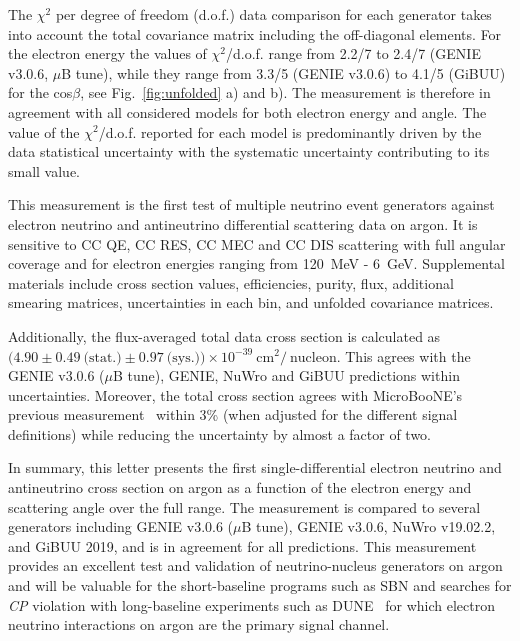 \documentclass[%
twocolumn,
superscriptaddress,
showpacs,preprintnumbers,
amsmath,amssymb,
aps,
prl,
longbibliography
]{revtex4-1}
\begin{document}
 The $\chi^2$ per degree of freedom (d.o.f.) data comparison for each generator takes into account the total covariance matrix including the off-diagonal elements. For the electron energy the values of $\chi^2$/d.o.f. range from 2.2/7 to 2.4/7 (GENIE v3.0.6, $\mu$B tune), while they range from 3.3/5 (GENIE v3.0.6) to 4.1/5 (GiBUU) for the cos$\beta$, see Fig.~\ref{fig:unfolded} a) and b). The measurement is therefore in agreement with all considered models for both electron energy and angle. The value of the $\chi^2$/d.o.f. reported for each model is predominantly driven by the data statistical uncertainty with the systematic uncertainty contributing to its small value.
 
 
This measurement is the first test of multiple neutrino event generators against electron neutrino and antineutrino differential scattering data on argon. It is sensitive to CC QE, CC RES, CC MEC and CC DIS scattering with full angular coverage and for electron energies ranging from 120~MeV - 6~GeV. Supplemental materials include cross section values, efficiencies, purity, flux, additional smearing matrices, uncertainties in each bin, and unfolded covariance matrices. 

Additionally, the flux-averaged total data cross section is calculated as $(4.90\pm\!0.49~\textrm{(stat.)}\pm\!0.97~\textrm{(sys.))}\!\times\!10^{-39}~\textrm{cm}^{2}/~\textrm{nucleon}$. This agrees with the GENIE v3.0.6 ($\mu$B tune), GENIE, NuWro and GiBUU predictions within uncertainties. Moreover, the total cross section agrees with MicroBooNE's previous measurement~\cite{microboonecollaboration2021measurement} within 3\% (when adjusted for the different signal definitions) while reducing the uncertainty by almost a factor of two.


In summary, this letter presents the first single-differential electron neutrino and antineutrino cross section on argon as a function of the electron energy and scattering angle over the full range. The measurement is compared to several generators including GENIE v3.0.6 ($\mu$B tune), GENIE v3.0.6, NuWro v19.02.2, and GiBUU 2019, and is in agreement for all predictions. This measurement provides an excellent test and validation of neutrino-nucleus generators on argon and will be valuable for the short-baseline programs such as SBN and searches for \emph{CP} violation with long-baseline experiments such as DUNE~\cite{dunecollaboration2020longbaseline} for which electron neutrino interactions on argon are the primary signal channel.
\end{document}
